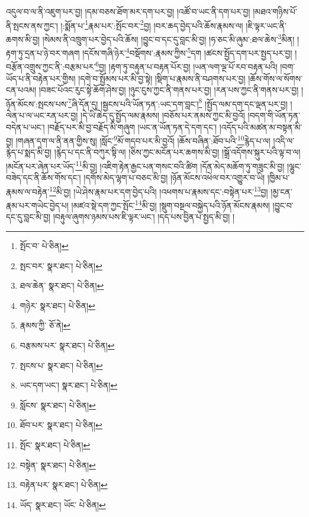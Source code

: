 འདུལ་བ་ལ་ནི་འཇུག་པར་བྱ། །དམ་བཅས་ཐོག་མར་དག་པར་བྱ། །འཚོ་བ་ཡང་ནི་དག་པར་བྱ། །མཐའ་གཉིས་པོ་ནི་སྤངས་ནས་ཀྱང་། །:སྨོན་པ་\footnote{སྤོང་བ་  པེ་ཅིན། }རྣམ་པར་:སྤོང་བར་\footnote{སྤང་བར་  སྣར་ཐང་།  པེ་ཅིན། }བྱ། །བར་ཆད་བྱེད་པའི་ཆོས་རྣམས་ལ། །ཇི་ལྟར་ཡང་ནི་ཆགས་མི་བྱ། །སེམས་ནི་འཁྲུག་པར་བྱེད་པའི་ཆོས། །བྱུང་བ་དང་དུ་བླང་མི་བྱ། །ཧ་ཅང་མི་ཞུམ་:ཐལ་ཆེས་\footnote{ཐལ་ཆེན་  སྣར་ཐང་།  པེ་ཅིན། }མིན། །རྟག་ཏུ་དྲན་པ་ཉེ་བར་གཞག །དངོས་གཞི་ཉེར་\footnote{གཉེར་  སྣར་ཐང་།  པེ་ཅིན། }བསྡོགས་:རྣམས་ཀྱིས་\footnote{རྣམས་ཀྱི་  ཅོ་ནེ། }དག །ཚངས་སྤྱོད་དག་པར་སྤྱད་པར་བྱ། །བརྩོན་འགྲུས་ཀྱང་ནི་:བརྩམ་པར་\footnote{བརྩམས་པར་  སྣར་ཐང་།  པེ་ཅིན། }བྱ། །རྟག་ཏུ་བརྟུན་པ་བརྟན་པོར་བྱ། །ཡན་ལག་ལྔ་པོ་རབ་བརྟན་པའི། །བག་ཡོད་པ་ནི་བརྟེན་པར་གྱིས། །དགེ་བ་སྤྱོམས་པར་མི་བྱ་སྟེ། །སྡིག་པ་རྣམས་ནི་བཤགས་པར་བྱ། །ཆོས་གོས་ལ་སོགས་ངན་པའམ། །བཟང་པོའང་རུང་སྟེ་ཆོག་ཤེས་བྱ། །ཉུང་ངུས་ཀྱང་ནི་གནས་པར་བྱ། །རན་པས་ཀྱང་ནི་གནས་པར་བྱ། །ཉོན་མོངས་:སྤངས་པས་\footnote{སྤངས་པ་  སྣར་ཐང་།  པེ་ཅིན། }ཞི་དོན་དུ། །སྦྱངས་པའི་ཡོན་ཏན་:ཡང་དག་བླང་།\footnote{ཡང་དག་ཡང་།  སྣར་ཐང་།  པེ་ཅིན། } །སྤྱོད་ལམ་དག་དང་ལྡན་པར་བྱ། །ལེན་པ་ལ་ཡང་རན་པར་བྱ། །དེ་ཡི་ཆེད་དུ་སྤྱོད་ལམ་རྣམས། །བཅོས་པར་ནམས་ཀྱང་མི་བྱའོ། །བདག་གི་ཡོན་ཏན་བདེན་པ་ཡང་། །བརྗོད་པར་མི་བྱ་བརྗོད་མི་གཞུག །ཡང་ན་ཡོན་ཏན་དེ་དག་དང་། །འདོད་པའི་མཚན་མ་བསྟན་མི་བྱ། །གཞན་དག་ལ་ནི་ནན་གྱིས་སུ། །སློང་\footnote{སློངས་  སྣར་ཐང་།  པེ་ཅིན། }མོ་གདབ་པར་མི་བྱའོ། །ཆོས་བཞིན་:ཐོབ་པའི་\footnote{ཐོབ་པར་  སྣར་ཐང་།  པེ་ཅིན། }རྙེད་པ་ལ། །འདི་ལ་རྙེད་པ་སྨད་མི་བྱ། །རྙེད་པ་དང་ནི་བཀུར་སྟི་ལ། །ཅིས་ཀྱང་མངོན་པར་ཆགས་མི་བྱ། །སྒྲོ་འདོགས་སྐུར་པའི་ལྟ་བ་ལ། །མངོན་པར་ཞེན་པར་ཡོད་\footnote{སྤོང་  སྣར་ཐང་།  པེ་ཅིན། }མི་བྱ། །འཇིག་རྟེན་རྒྱང་པན་གསང་བའི་ཚིག །དོན་མེད་མཆོག་ཏུ་གཟུང་མི་བྱ། །ལྷུང་བཟེད་དང་ནི་ཆོས་གོས་དང་། །དགོས་མེད་ལྷག་པ་བཅང་མི་བྱ། །ཉོན་མོངས་འཕེལ་བར་འགྱུར་བ་ཡི། །ཁྱིམ་པ་རྣམས་ལ་བརྟེན་\footnote{བསྟེན་  སྣར་ཐང་།  པེ་ཅིན། }མི་བྱ། །ཡེ་ཤེས་རྣམ་པར་དག་བྱེད་པའི། །འཕགས་པ་རྣམས་དང་:བསྟེན་པར་\footnote{བརྟེན་པར་  སྣར་ཐང་།  པེ་ཅིན། }བྱ། །མྱ་ངན་རྣམ་པར་གཡེང་བྱེད་པ། །མཛའ་སྡེ་དག་ཀྱང་སྤོང་\footnote{ཡོད་  སྣར་ཐང་། ཡོང་  པེ་ཅིན། }མི་བྱ། །སྡུག་བསྔལ་བསྐྱེད་པའི་ཉོན་མོངས་རྣམས། །བྱུང་བ་དང་དུ་བླང་མི་བྱ། །བརྟུལ་ཞུགས་ཉམས་པས་ཇི་ལྟར་ཡང་། །དད་པས་བྱིན་པ་སྤྱད་མི་བྱ། །
